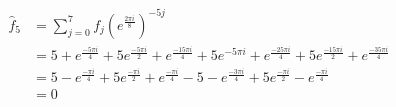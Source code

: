 \documentclass{report}
\begin{document}
\begin{solution}
\begin{enumerate}[label=(\alph*)]
\begin{align*}
			      \hat{f}_5 & = \sum_{j=0}^{7} f_{j} \left(e^{\frac{2\pi i}{8}}\right)^{-5j} \\
			                & =   5 + e^{\frac{-5\pi i}{4}} + 5e^{\frac{-5\pi i }{2}} + e^{\frac{-15\pi i }{4}} +5 e^{-5\pi i }
			      + e^{\frac{-25\pi i}{4}} + 5e^{\frac{-15\pi i}{2}} + e^{\frac{-35\pi i}{4}} \\
			                & =  5 - e^{\frac{-\pi i}{4}} + 5e^{\frac{-\pi i }{2}} + e^{\frac{-\pi i }{4}} -5
			      - e^{\frac{-3\pi i}{4}} + 5e^{\frac{-\pi i}{2}} - e^{\frac{-\pi i}{4}} \\
			                & =  0 \\
		      \end{align*}
	\end{enumerate}
\end{solution}
\end{document}
